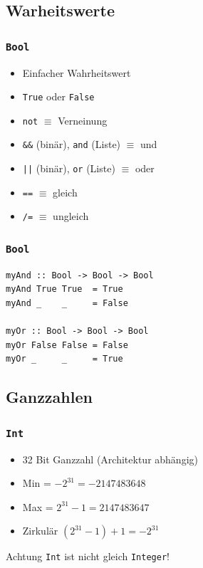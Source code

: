 \subsection{Warheitswerte}
\begin{frame}
\frametitle{\lstinline|Bool|}
\begin{block}{\vspace*{-3ex}}
\begin{itemize}
  \item Einfacher Wahrheitswert
  \item \lstinline|True| oder \lstinline|False|
  \item \lstinline|not| $\equiv$ Verneinung
  \item \lstinline|&&| (binär), \lstinline|and| (Liste) $\equiv$ und
  \item \lstinline!||! (binär), \lstinline|or| (Liste) $\equiv$ oder
  \item \lstinline|==| $\equiv$ gleich
  \item \lstinline|/=| $\equiv$ ungleich
\end{itemize}
\end{block}
\end{frame}

\begin{frame}[fragile]
\frametitle{\lstinline|Bool|} 
\begin{lstlisting}
myAnd :: Bool -> Bool -> Bool
myAnd True True  = True
myAnd _    _     = False

myOr :: Bool -> Bool -> Bool
myOr False False = False
myOr _     _     = True
\end{lstlisting}
\end{frame}
\subsection{Ganzzahlen}
\begin{frame}
\frametitle{\lstinline|Int|}
\begin{block}{\vspace*{-3ex}}
\begin{itemize}
  \item 32 Bit Ganzzahl (Architektur abhängig)
  \item Min = $-2^{31} = -2147483648$
  \item Max = $2^{31} - 1 = 2147483647$
  \item Zirkulär $(2^{31} - 1) + 1 = -2^{31}$ 
\end{itemize}
\end{block}
\begin{alertblock}{Achtung}
\lstinline|Int| ist nicht gleich \lstinline|Integer|!
\end{alertblock}
\end{frame}

